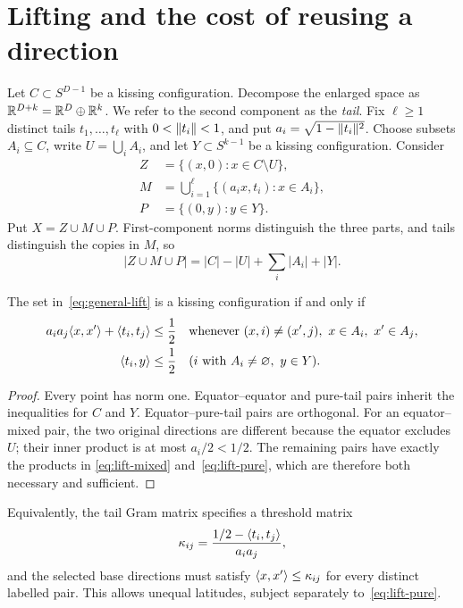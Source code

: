 \section{Lifting and the cost of reusing a direction}\label{sec:lifting}

Let $C\subset S^{D-1}$ be a kissing configuration. Decompose the enlarged
space as $\mathbb R^{D+k}=\mathbb R^D\oplus\mathbb R^k$. We refer to the second component as
the \emph{tail}. Fix $\ell\ge1$ distinct tails $t_1,\ldots,t_\ell$ with
$0<\lVert t_i\rVert<1$, and put $a_i=\sqrt{1-\lVert t_i\rVert^2}$. Choose subsets
$A_i\subseteq C$, write $U=\bigcup_i A_i$, and let
$Y\subset S^{k-1}$ be a kissing configuration. Consider
\begin{align}
 Z&=\{(x,0):x\in C\setminus U\},\nonumber\\
 M&=\bigcup_{i=1}^{\ell}\{(a_i x,t_i):x\in A_i\},\label{eq:general-lift}\\
 P&=\{(0,y):y\in Y\}.\nonumber
\end{align}
Put $X=Z\cup M\cup P$. First-component norms distinguish the three
parts, and tails distinguish the copies in $M$, so
\begin{equation}\label{eq:lift-count}
 |Z\cup M\cup P|=|C|-|U|+\sum_i|A_i|+|Y|.
\end{equation}

\begin{theorem}\label{lem:lift}
The set in~\eqref{eq:general-lift} is a kissing configuration if and only if
\begin{align}
 a_i a_j\langle x,x'\rangle+\langle t_i,t_j\rangle&\le\frac12
 &&\text{whenever }(x,i)\ne(x',j),\ x\in A_i,\ x'\in A_j,
 \label{eq:lift-mixed}\\
 \langle t_i,y\rangle&\le\frac12
 &&(i\text{ with }A_i\ne\varnothing,\ y\in Y).\label{eq:lift-pure}
\end{align}
\end{theorem}
\begin{proof}
Every point has norm one. Equator--equator and pure-tail pairs inherit
the inequalities for $C$ and $Y$. Equator--pure-tail pairs are orthogonal.
For an equator--mixed pair, the two original directions are different
because the equator excludes $U$; their inner product is at most
$a_i/2<1/2$. The remaining pairs have exactly the products in
\eqref{eq:lift-mixed} and~\eqref{eq:lift-pure}, which are therefore
both necessary and sufficient.
\end{proof}

Equivalently, the tail Gram matrix specifies a threshold matrix
\begin{equation}\label{eq:kappa}
 \kappa_{ij}=\frac{1/2-\langle t_i,t_j\rangle}{a_i a_j},
\end{equation}
and the selected base directions must satisfy
$\langle x,x'\rangle\le\kappa_{ij}$ for every distinct labelled pair.
This allows unequal latitudes, subject separately to~\eqref{eq:lift-pure}.

